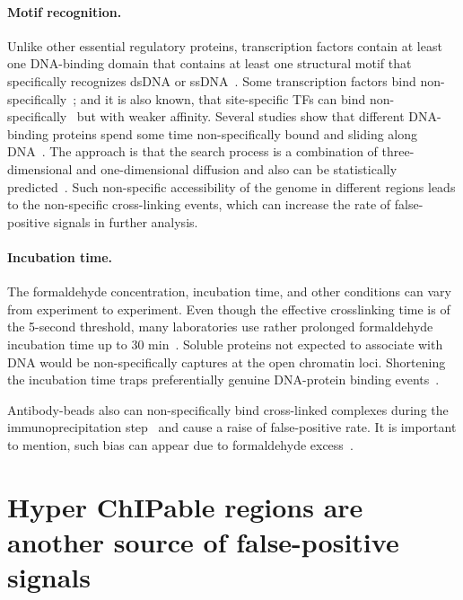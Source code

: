\paragraph{Motif recognition.}
Unlike other essential regulatory proteins, transcription factors contain at least one DNA-binding domain that contains at least one structural motif that specifically recognizes dsDNA or ssDNA~\cite{mitchell1989transcriptional}.
Some transcription factors bind non-specifically~\cite{struhl2007interpreting};
and it is also known, that site-specific TFs can bind non-specifically~\cite{hammar2012lac,mirny2009protein} but with weaker affinity.
Several studies show that different DNA-binding proteins spend some time non-specifically bound and sliding along DNA~\cite{slutsky2004kinetics,mirny2010nucleosome,cherstvy2008protein,hu2006proteins,sheinman2009effects}.
The approach is that the search process is a combination of three-dimensional and one-dimensional diffusion and also can be statistically predicted~\cite{sela2011dna}.
Such non-specific accessibility of the genome in different regions leads to the non-specific cross-linking events, which can increase the rate of false-positive signals in further analysis.

\paragraph{Incubation time.}
The formaldehyde concentration, incubation time, and other conditions can vary from experiment to experiment. 
Even though the effective crosslinking time is of the 5-second threshold, many laboratories use rather prolonged formaldehyde incubation time up to 30 min~\cite{schmiedeberg2009temporal}.
Soluble proteins not expected to associate with DNA would be non-specifically captures at the open chromatin loci. Shortening the incubation time traps preferentially genuine DNA-protein binding events~\cite{baranello2016chip}.

Antibody-beads also can non-specifically bind cross-linked complexes during the immunoprecipitation step~\cite{zhu2014fast} and cause a raise of false-positive rate.
It is important to mention, such bias can appear due to formaldehyde excess~\cite{hanson2018using}.

\section{Hyper ChIPable regions are another source of false-positive signals}

